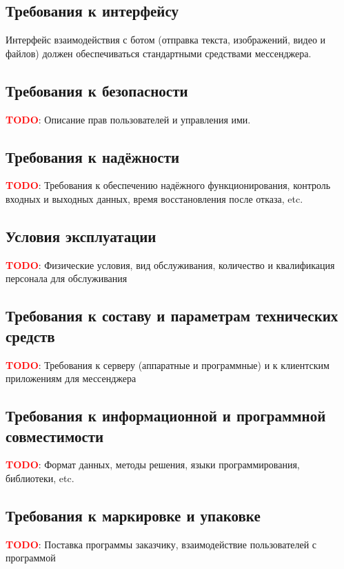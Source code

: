 \documentclass[12pt]{article}
\newcommand{\todo}[1]{\textcolor{red}{\textbf{TODO}}: #1}
\begin{document}
    \subsection{Требования к интерфейсу}
        \label{sec:req:ui}
        Интерфейс взаимодействия с ботом (отправка текста, изображений, видео и файлов)
        должен обеспечиваться стандартными средствами мессенджера.


    \subsection{Требования к безопасности}
        \label{sec:req:sec}
        \todo{Описание прав пользователей и управления ими.}

    \subsection{Требования к надёжности}
        \label{sec:req:reliab}
        \todo{Требования к обеспечению надёжного функционирования,
        контроль входных и выходных данных, время восстановления после отказа, etc.}

    \subsection{Условия эксплуатации}
        \label{sec:req:maint}
        \todo{Физические условия, вид обслуживания, количество и квалификация персонала для обслуживания}

    \subsection{Требования к составу и параметрам технических средств}
        \label{sec:req:hw}
        \todo{Требования к серверу (аппаратные и программные) и к клиентским приложениям для мессенджера}

    \subsection{Требования к информационной и программной совместимости}
        \label{sec:req:compat}
        \todo{Формат данных, методы решения, языки программирования, библиотеки, etc.}

    \subsection{Требования к маркировке и упаковке}
        \label{sec:req:ship}
        \todo{Поставка программы заказчику, взаимодействие пользователей с программой}
\end{document}
